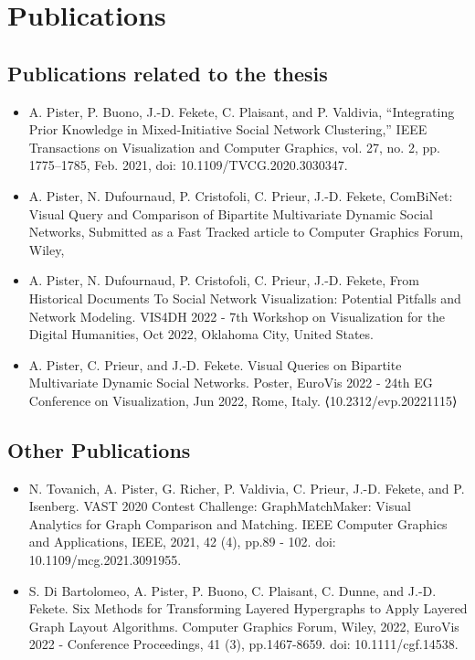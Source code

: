 \chapter*{Publications}

\section*{Publications related to the thesis}

\begin{itemize}
    \item A. Pister, P. Buono, J.-D. Fekete, C. Plaisant, and P. Valdivia, “Integrating Prior Knowledge in Mixed-Initiative Social Network Clustering,” IEEE Transactions on Visualization and Computer Graphics, vol. 27, no. 2, pp. 1775–1785, Feb. 2021, doi: 10.1109/TVCG.2020.3030347.
    \item A. Pister, N. Dufournaud, P. Cristofoli, C. Prieur, J.-D. Fekete, ComBiNet: Visual Query and Comparison of Bipartite Multivariate Dynamic Social Networks, Submitted as a Fast Tracked article to Computer Graphics Forum, Wiley, 
    \item A. Pister, N. Dufournaud, P. Cristofoli, C. Prieur, J.-D. Fekete, From Historical Documents To Social Network Visualization: Potential Pitfalls and Network Modeling. VIS4DH 2022 - 7th Workshop on Visualization for the Digital Humanities, Oct 2022, Oklahoma City, United States.
    \item  A. Pister, C. Prieur, and J.-D. Fekete. Visual Queries on Bipartite Multivariate Dynamic Social Networks. Poster, EuroVis 2022 - 24th EG Conference on Visualization, Jun 2022, Rome, Italy. ⟨10.2312/evp.20221115⟩
\end{itemize}


\section*{Other Publications}

\begin{itemize}
    \item N. Tovanich, A. Pister, G. Richer, P. Valdivia, C. Prieur, J.-D. Fekete, and P. Isenberg. VAST 2020 Contest Challenge: GraphMatchMaker: Visual Analytics for Graph Comparison and Matching. IEEE Computer Graphics and Applications, IEEE, 2021, 42 (4), pp.89 - 102. doi: 10.1109/mcg.2021.3091955.
    \item S. Di Bartolomeo, A. Pister, P. Buono, C. Plaisant, C. Dunne, and J.-D. Fekete. Six Methods for Transforming Layered Hypergraphs to Apply Layered Graph Layout Algorithms. Computer Graphics Forum, Wiley, 2022, EuroVis 2022 - Conference Proceedings, 41 (3), pp.1467-8659. doi: 10.1111/cgf.14538.
\end{itemize}

